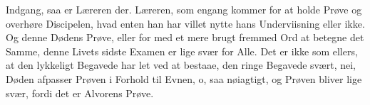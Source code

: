\documentclass[12pt,a4paper]{article}
\begin{document}
Indgang, saa er Læreren der. Læreren, som engang kommer for at holde Prøve og overhøre Discipelen, hvad enten han har villet nytte hans Underviisning eller ikke. Og denne Dødens Prøve, eller for med et mere brugt fremmed Ord at betegne det Samme, denne Livets sidste Examen er lige svær for Alle. Det er ikke som ellers, at den lykkeligt Begavede har let ved at bestaae, den ringe Begavede svært, nei, Døden afpasser Prøven i Forhold til Evnen, o, saa nøiagtigt, og Prøven bliver lige svær, fordi det er Alvorens Prøve.
\end{document}
